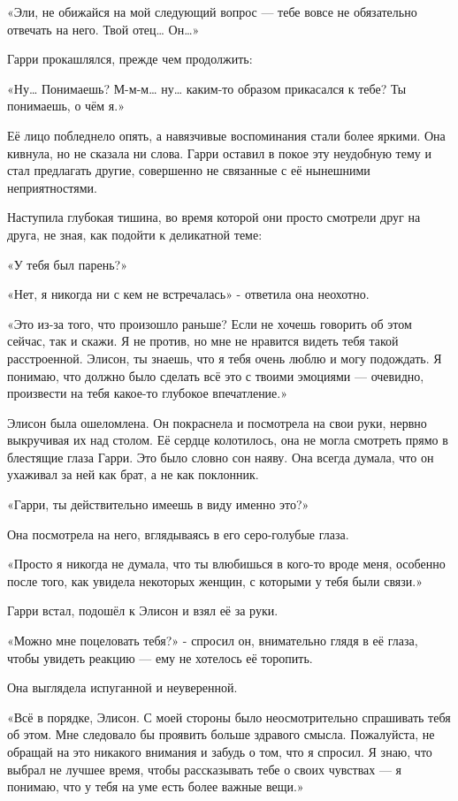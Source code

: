 \documentclass[a4paper,12pt]{book}
\begin{document}
\par
«Эли, не обижайся на мой следующий вопрос — тебе вовсе не обязательно отвечать на него. Твой отец… Он…»
\par
Гарри прокашлялся, прежде чем продолжить:
\par
«Ну… Понимаешь? М-м-м… ну… каким-то образом прикасался к тебе? Ты понимаешь, о чём я.»
\par
Её лицо побледнело опять, а навязчивые воспоминания стали более яркими. Она кивнула, но не сказала ни слова. Гарри оставил в покое эту неудобную тему и стал предлагать другие, совершенно не связанные с её нынешними неприятностями.\\
\par
	Наступила глубокая тишина, во время которой они просто смотрели друг на друга, не зная, как подойти к деликатной теме:
\par
«У тебя был парень?»
\par
«Нет, я никогда ни с кем не встречалась» - ответила она неохотно.
\par
«Это из-за того, что произошло раньше? Если не хочешь говорить об этом сейчас, так и скажи. Я не против, но мне не нравится видеть тебя такой расстроенной. Элисон, ты знаешь, что я тебя очень люблю и могу подождать. Я понимаю, что должно было сделать всё это с твоими эмоциями — очевидно, произвести на тебя какое-то глубокое впечатление.»
\par
Элисон была ошеломлена. Он покраснела и посмотрела на свои руки, нервно выкручивая их над столом. Её сердце колотилось, она не могла смотреть прямо в блестящие глаза Гарри. Это было словно сон наяву. Она всегда думала, что он ухаживал за ней как брат, а не как поклонник.
\par
«Гарри, ты действительно имеешь в виду именно это?»
\par
Она посмотрела на него, вглядываясь в его серо-голубые глаза.
\par
«Просто я никогда не думала, что ты влюбишься в кого-то вроде меня, особенно после того, как увидела некоторых женщин, с которыми у тебя были связи.»
\par
Гарри встал, подошёл к Элисон и взял её за руки.
\par
«Можно мне поцеловать тебя?» - спросил он, внимательно глядя в её глаза, чтобы увидеть реакцию — ему не хотелось её торопить.
\par
Она выглядела испуганной и неуверенной.
\par
«Всё в порядке, Элисон. С моей стороны было неосмотрительно спрашивать тебя об этом. Мне следовало бы проявить больше здравого смысла. Пожалуйста, не обращай на это никакого внимания и забудь о том, что я спросил. Я знаю, что выбрал не лучшее время, чтобы рассказывать тебе о своих чувствах — я понимаю, что у тебя на уме есть более важные вещи.»
\end{document}
